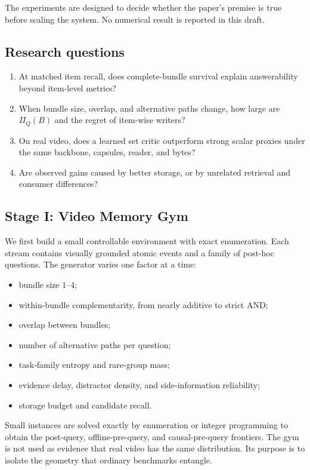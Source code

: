 \documentclass[10pt,twocolumn,letterpaper]{article}
\begin{document}
The experiments are designed to decide whether the paper's premise is true before scaling the system.
No numerical result is reported in this draft.

\subsection{Research questions}

\begin{enumerate}[leftmargin=*,itemsep=2pt]
    \item[\textbf{RQ1}] At matched item recall, does complete-bundle survival explain answerability beyond item-level metrics?
    \item[\textbf{RQ2}] When bundle size, overlap, and alternative paths change, how large are $\Pi_Q(B)$ and the regret of item-wise writers?
    \item[\textbf{RQ3}] On real video, does a learned set critic outperform strong scalar proxies under the same backbone, capsules, reader, and bytes?
    \item[\textbf{RQ4}] Are observed gains caused by better storage, or by unrelated retrieval and consumer differences?
\end{enumerate}

\subsection{Stage I: Video Memory Gym}

We first build a small controllable environment with exact enumeration.
Each stream contains visually grounded atomic events and a family of post-hoc questions.
The generator varies one factor at a time:
\begin{itemize}[leftmargin=*,itemsep=1pt]
    \item bundle size $1$--$4$;
    \item within-bundle complementarity, from nearly additive to strict AND;
    \item overlap between bundles;
    \item number of alternative paths per question;
    \item task-family entropy and rare-group mass;
    \item evidence delay, distractor density, and side-information reliability;
    \item storage budget and candidate recall.
\end{itemize}
Small instances are solved exactly by enumeration or integer programming to obtain the post-query, offline-pre-query, and causal-pre-query frontiers.
The gym is not used as evidence that real video has the same distribution.
Its purpose is to isolate the geometry that ordinary benchmarks entangle.
\end{document}
